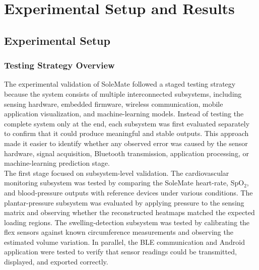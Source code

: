 
\chapter{Experimental Setup and Results}
\label{chapter:Experiments_Resutls}

\section{Experimental Setup}
\label{sec:experimental_setup}

\subsection{Testing Strategy Overview}
\label{subsec:testing_strategy_overview}

\noindent The experimental validation of SoleMate followed a staged testing strategy because the system consists of multiple interconnected subsystems, including sensing hardware, embedded firmware, wireless communication, mobile application visualization, and machine-learning models. Instead of testing the complete system only at the end, each subsystem was first evaluated separately to confirm that it could produce meaningful and stable outputs. This approach made it easier to identify whether any observed error was caused by the sensor hardware, signal acquisition, Bluetooth transmission, application processing, or machine-learning prediction stage.  \\

\noindent The first stage focused on subsystem-level validation. The cardiovascular monitoring subsystem was tested by comparing the SoleMate heart-rate, SpO$_2$, and blood-pressure outputs with reference devices under various conditions. The plantar-pressure subsystem was evaluated by applying pressure to the sensing matrix and observing whether the reconstructed heatmaps matched the expected loading regions. The swelling-detection subsystem was tested by calibrating the flex sensors against known circumference measurements and observing the estimated volume variation. In parallel, the BLE communication and Android application were tested to verify that sensor readings could be transmitted, displayed, and exported correctly. \\


